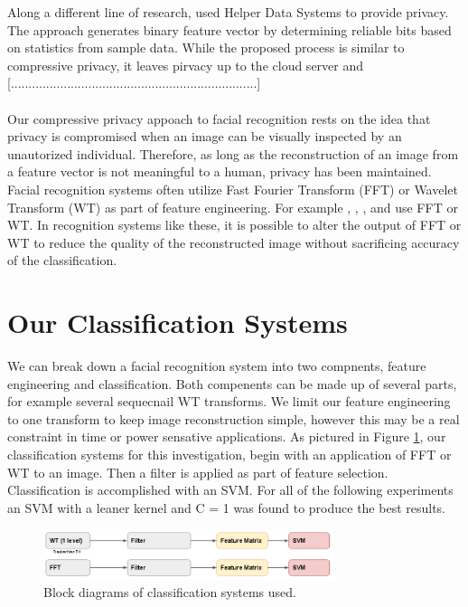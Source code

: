 \documentclass{article}
\begin{document}
Along a different line of research, \cite{kevenaar2005face} used Helper Data Systems to provide privacy. The approach generates binary 
feature vector by determining reliable bits based on statistics from sample data. While the proposed process is similar to compressive
privacy, it leaves pirvacy up to the cloud server and [......................................................................] 
\\\\
Our compressive privacy appoach to facial recognition rests on the idea that privacy is compromised when an image can be visually 
inspected by an unautorized individual. Therefore, as long as the reconstruction of an image from a feature vector is not meaningful 
to a human, privacy has been maintained. Facial recognition systems often utilize Fast Fourier Transform (FFT) or Wavelet Transform (WT) 
as part of feature engineering. For example \cite{spies2000face}, \cite{bouzalmat2011facial}, 
\cite{dehai2013pca}, and \cite{samra2003face} use FFT or WT. In recognition systems like these, it is possible to 
alter the output of FFT or WT to reduce the quality of the reconstructed image without sacrificing accuracy of the classification.           

\section{Our Classification Systems}
\label{sec:system}

We can break down a facial recognition system into two compnents, feature engineering and
classification. Both compenents can be made up of several parts, for example several sequecnail WT transforms. 
We limit our feature engineering to one transform to keep image reconstruction simple, however this may be 
a real constraint in time or power sensative applications. 
As pictured in Figure \ref{fig:mysys}, our classification systems for this investigation, 
begin with an application of FFT or WT to an image. 
Then a filter is applied as part of feature selection. Classification is 
accomplished with an SVM. For all of the following experiments an SVM with a 
leaner kernel and C = 1 was found to produce the best results.    

\begin{figure}[htb]

\begin{minipage}[b]{1.0\linewidth}
  \centering
  \centerline{\includegraphics[width=8.5cm]{mysys}}
\end{minipage}
%
\caption{Block diagrams of classification systems used.}
\label{fig:mysys}
%
\end{figure}
\end{document}
